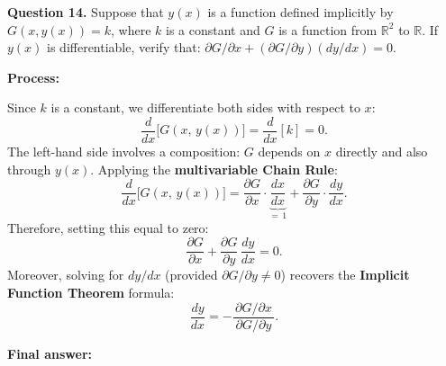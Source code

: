 \textbf{Question 14.} Suppose that $y(x)$ is a function defined implicitly by 
$G(x, y(x)) = k$, where $k$ is a constant and $G$ is a function from $\mathbb{R}^2$ 
to $\mathbb{R}$. If $y(x)$ is differentiable, verify that: 
$\partial G/\partial x + (\partial G/\partial y)(dy/dx) = 0$.
\begin{respuesta}

\textbf{Process:}

Since $k$ is a constant, we differentiate both sides with respect to $x$:
\[
    \frac{d}{dx}\bigl[G(x,\,y(x))\bigr] = \frac{d}{dx}[k] = 0.
\]
The left-hand side involves a composition: $G$ depends on $x$ directly 
and also through $y(x)$. Applying the \textbf{multivariable Chain Rule}:
\[
    \frac{d}{dx}\bigl[G(x,\,y(x))\bigr]
    = \frac{\partial G}{\partial x}\cdot\underbrace{\frac{dx}{dx}}_{=\,1}
    + \frac{\partial G}{\partial y}\cdot\frac{dy}{dx}.
\]
Therefore, setting this equal to zero:
\[
    \frac{\partial G}{\partial x} + \frac{\partial G}{\partial y}\,\frac{dy}{dx} 
    = 0.  
\]
Moreover, solving for $dy/dx$ (provided $\partial G/\partial y \neq 0$) 
recovers the \textbf{Implicit Function Theorem} formula:
\[
    \frac{dy}{dx} = -\frac{\,\partial G/\partial x\,}{\partial G/\partial y}.
\]

    \textbf{Final answer:}
    \begin{center}
    \end{center}
\end{respuesta}